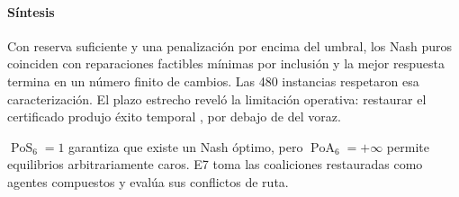 \paragraph{Síntesis}

Con reserva suficiente y una penalización por encima del umbral, los Nash puros coinciden con reparaciones factibles mínimas por inclusión y la mejor respuesta termina en un número finito de cambios. Las 480 instancias respetaron esa caracterización. El plazo estrecho reveló la limitación operativa: restaurar el certificado produjo éxito temporal \SPSixTightPotentialSuccess{}, por debajo de \SPSixTightGreedySuccess{} del voraz.

$\operatorname{PoS}_6=1$ garantiza que existe un Nash óptimo, pero $\operatorname{PoA}_6=+\infty$ permite equilibrios arbitrariamente caros. E7 toma las coaliciones restauradas como agentes compuestos y evalúa sus conflictos de ruta.
